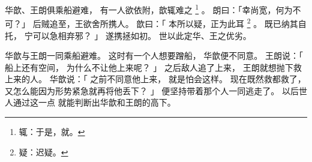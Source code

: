
\switchcolumn*[\section{}]

华歆、王朗俱乘船避难，
有一人欲依附，歆辄难之%
\footnote{%
    辄：于是，就。
}%
。
朗曰：「幸尚宽，何为不可？」
后贼追至，王欲舍所携人。
歆曰：「
    本所以疑，正为此耳%
    \footnote{%
        疑：迟疑。
    }%
    。
    既已纳其自托，
    宁可以急相弃邪？
」
遂携拯如初。
世以此定华、王之优劣。

\switchcolumn

华歆与王朗一同乘船避难。
这时有一个人想要蹭船，
华歆便不同意。
王朗说：「
    船上还有空间，
    为什么不让他上来呢？
」
之后敌人追了上来，
王朗就想抛下救上来的人。
华歆说：「
    之前不同意他上来，
    就是怕会这样。
    现在既然救都救了，
    又怎么能因为形势紧急就再将他丢下？
」
便坚持带着那个人一同逃走了。
以后世人通过这一点
就能判断出华歆和王朗的高下。

